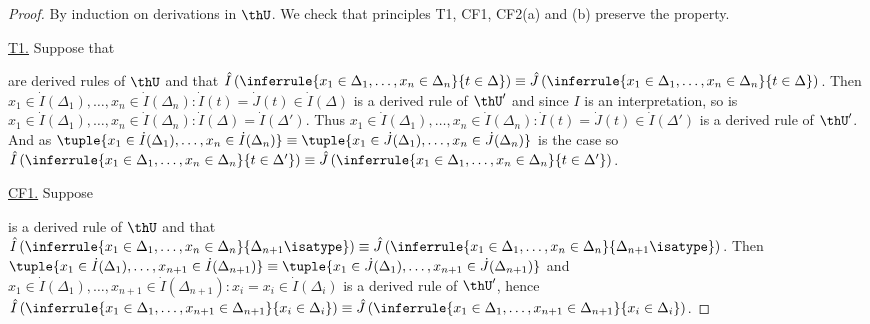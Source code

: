  \begin{proof}
    By induction on derivations in $\thU$.
    We check that principles T1, CF1, CF2(a) and (b) preserve the property.

    \underline{T1.} Suppose that
    are derived rules of $\thU$ and that $\hat{I}\left(\inferrule{x_1 \in \Delta_1, \dots, x_n \in \Delta_n}{t \in \Delta}\right) \equiv \hat{J}\left(\inferrule{x_1 \in \Delta_1, \dots, x_n \in \Delta_n}{t \in \Delta}\right)$.
    Then $x_1 \in \dot{I}(\Delta_1), \dots, x_n \in \dot{I}(\Delta_n) : \dot{I}(t) = \dot{J}(t) \in \dot{I}(\Delta)$ is a derived rule of $\thU'$ and since $I$ is an interpretation, so is $x_1 \in \dot{I}(\Delta_1), \dots, x_n \in \dot{I}(\Delta_n) : \dot{I}(\Delta) = \dot{I}(\Delta')$.
    Thus $x_1 \in \dot{I}(\Delta_1), \dots, x_n \in \dot{I}(\Delta_n) : \dot{I}(t) = \dot{J}(t) \in \dot{I}(\Delta')$ is a derived rule of $\thU'$.
    And as $\tuple{x_1 \in \dot{I}(\Delta_1), \dots, x_n \in \dot{I}(\Delta_n)} \equiv \tuple{x_1 \in \dot{J}(\Delta_1), \dots, x_n \in \dot{J}(\Delta_n)}$ is the case so $\hat{I}\left(\inferrule{x_1 \in \Delta_1, \dots, x_n \in \Delta_n}{t \in \Delta'}\right) \equiv \hat{J}\left(\inferrule{x_1 \in \Delta_1, \dots, x_n \in \Delta_n}{t \in \Delta'}\right)$.

    \underline{CF1.} Suppose
    \begin{mathpar}
    \end{mathpar}
    is a derived rule of $\thU$ and that $\hat{I}\left(\inferrule{x_1 \in \Delta_1, \dots, x_n \in \Delta_n}{\Delta_{n+1} \isatype}\right) \equiv \hat{J}\left(\inferrule{x_1 \in \Delta_1, \dots, x_n \in \Delta_n}{\Delta_{n+1} \isatype}\right)$.
    Then $\tuple{x_1 \in \dot{I}(\Delta_1), \dots, x_{n+1} \in \dot{I}(\Delta_{n+1})} \equiv \tuple{x_1 \in \dot{J}(\Delta_1), \dots, x_{n+1} \in \dot{J}(\Delta_{n+1})}$ and $x_1 \in \dot{I}(\Delta_1), \dots, x_{n+1} \in \dot{I}(\Delta_{n+1}) : x_i = x_i \in \dot{I}(\Delta_i)$ is a derived rule of $\thU'$, hence $\hat{I}\left(\inferrule{x_1 \in \Delta_1, \dots, x_{n+1} \in \Delta_{n+1}}{x_i \in \Delta_i}\right) \equiv \hat{J}\left(\inferrule{x_1 \in \Delta_1, \dots, x_{n+1} \in \Delta_{n+1}}{x_i \in \Delta_i}\right)$.


\end{proof}
